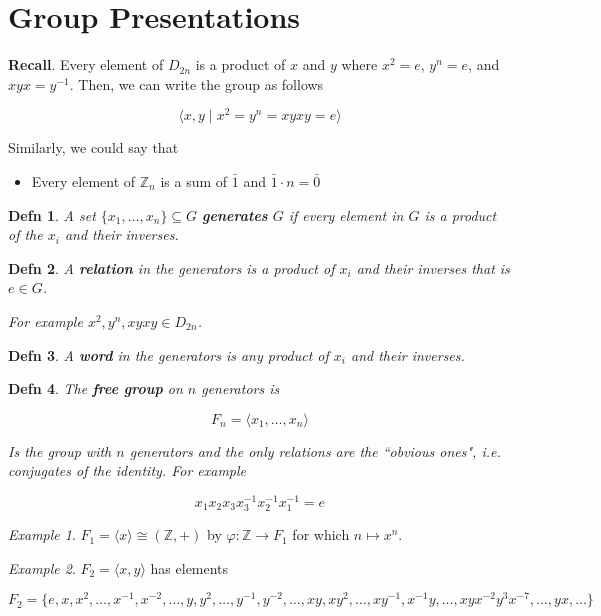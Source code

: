 \documentclass[12pt]{article}
\def\Z{{\mathbb Z}}
\newcommand{\lr}[1]{\langle #1 \rangle}
\newtheorem{definition}{Defn}
\theoremstyle{remark}
\theoremstyle{remark}
\theoremstyle{remark}
\newtheorem{example}{Example}
\theoremstyle{remark}
\theoremstyle{remark}
\begin{document}
\section{Group Presentations}

{\bf Recall}. Every element of $D_{2n}$ is a product of $x$ and $y$ where $x^2 =
e$, $y^n = e$, and $xyx = y^{-1}$. Then, we can write the group as follows


\[
  \lr{x, y \mid x^2 = y^n = xyxy = e }
\]

Similarly, we could say that

\begin{itemize}
  \item Every element of $\Z_n$ is a sum of $\bar 1$ and $\bar 1 \cdot n = \bar
    0$
\end{itemize}

\begin{definition}
  A set $\{x_1, \dots, x_n\} \subseteq G$ {\bf generates} $G$ if every element
  in $G$ is a product of the $x_i$ and their inverses.
\end{definition}

\begin{definition}
  A {\bf relation} in the generators is a product of $x_i$ and their inverses
  that is $e \in G$.

  For example $x^2, y^n, xyxy \in D_{2n}$.
\end{definition}

\begin{definition}
  A {\bf word} in the generators is any product of $x_i$ and their inverses.
\end{definition}

\begin{definition}
  The {\bf free group} on $n$ generators is 

  \[
    F_n = \lr{x_1, \dots, x_n}
  \]

  Is the group with $n$ generators and the only relations are the ``obvious
  ones", i.e. conjugates of the identity. For example 

  \[
    x_1 x_2 x_3  x_3^{-1} x_2^{-1} x_1^{-1} = e
  \]
\end{definition}

\begin{example}
  $F_1 = \lr{ x } \cong (\Z, +)$ by $\varphi: \Z \to F_1$ for which $n \mapsto
  x^n$.
\end{example}

\begin{example}
  $F_2 = \lr {x, y}$ has elements

  \[
    F_2 = \{e, x, x^2, \dots, x^{-1}, x^{-2}, \dots, y, y^2, \dots, y^{-1},
    y^{-2}, \dots, xy, xy^2, \dots, xy^{-1}, x^{-1}y, \dots, xyx^{-2}y^3x^{-7},
    \dots, yx, \dots\}
  \]
\end{example}
\end{document}
